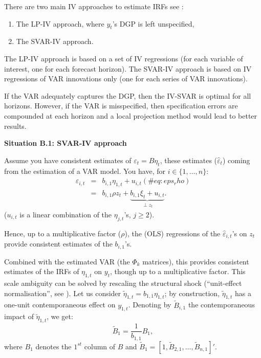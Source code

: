 \documentclass[
  12pt,
]{book}
\providecommand{\tightlist}{%
  \setlength{\itemsep}{0pt}\setlength{\parskip}{0pt}}
\theoremstyle{definition}
\theoremstyle{definition}
\theoremstyle{definition}
\theoremstyle{definition}
\theoremstyle{remark}
\begin{document}
There are two main IV approaches to estimate IRFs see \citet{Stock_Watson_2018}:

\begin{enumerate}
\def\labelenumi{\alph{enumi}.}
\tightlist
\item
  The LP-IV approach, where \(y_t\)'s DGP is left unspecified,
\item
  The SVAR-IV approach.
\end{enumerate}

The LP-IV approach is based on a set of IV regressions (for each variable of interest, one for each forecast horizon). The SVAR-IV approach is based on IV regressions of VAR innovations only (one for each series of VAR innovations).

If the VAR adequately captures the DGP, then the IV-SVAR is optimal for all horizons. However, if the VAR is misspecified, then specification errors are compounded at each horizon and a local projection method would lead to better results.

\textbf{Situation B.1: SVAR-IV approach}

Assume you have consistent estimates of \(\varepsilon_t = B\eta_t\), these estimates (\(\hat\varepsilon_{t}\)) coming from the estimation of a VAR model. You have, for \(i \in \{1,\dots,n\}\):
\begin{eqnarray}
\varepsilon_{i,t} &=& b_{i,1} \eta_{1,t} + u_{i,t} (\#eq:eps_rho)\\
&=& b_{i,1} \rho z_t + \underbrace{b_{i,1}\xi_t + u_{i,t}}_{\perp z_t}. \nonumber
\end{eqnarray}
(\(u_{i,t}\) is a linear combination of the \(\eta_{j,t}\)'s, \(j\ge2\)).

Hence, up to a multiplicative factor (\(\rho\)), the (OLS) regressions of the \(\hat\varepsilon_{i,t}\)'s on \(z_t\) provide consistent estimates of the \(b_{i,1}\)'s.

Combined with the estimated VAR (the \(\Phi_k\) matrices), this provides consistent estimates of the IRFs of \(\eta_{1,t}\) on \(y_t\), though up to a multiplicative factor. This scale ambiguity can be solved by rescaling the structural shock (``unit-effect normalisation'', see \citet{Stock_Watson_2018}). Let us consider \(\tilde\eta_{1,t}=b_{1,1}\eta_{1,t}\); by construction, \(\tilde\eta_{1,t}\) has a one-unit contemporaneous effect on \(y_{1,t}\). Denoting by \(\tilde{B}_{i,1}\) the contemporaneous impact of \(\tilde\eta_{1,t}\), we get:
\[
\tilde{B}_{1} = \frac{1}{b_{1,1}} {B}_{1},
\]
where \(B_{1}\) denotes the \(1^{st}\) column of \(B\) and \(\tilde{B}_{1}=[1,\tilde{B}_{2,1},\dots,\tilde{B}_{n,1}]'\).
\end{document}
